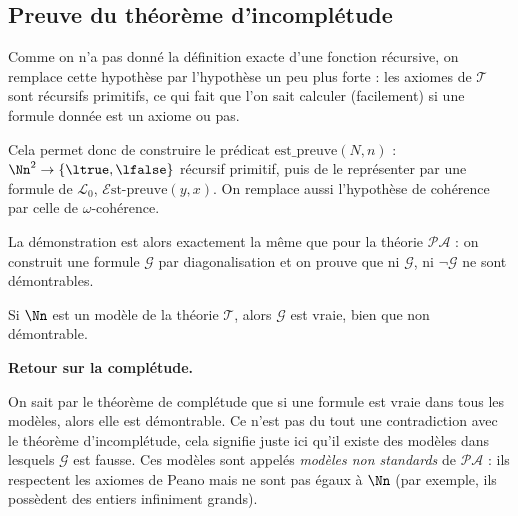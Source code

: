 \documentclass[11pt,class=report,crop=false]{standalone}
\begin{document}
\subsection{Preuve du théorème d'incomplétude}


Comme on n'a pas donné la définition exacte d'une fonction récursive, on remplace cette hypothèse par l'hypothèse un peu plus forte : \og{}les axiomes de $\mathcal{T}$ sont récursifs primitifs\fg{}, ce qui fait que l'on sait calculer (facilement) si une formule donnée est un axiome ou pas.

Cela permet donc de construire le prédicat $\text{est\_preuve}(N, n)$ : $\Nn^2 \to \{\ltrue,\lfalse\}$ récursif primitif, puis de le représenter par une formule de $\mathcal{L}_0$, $\mathcal{E}\text{st-preuve}(y, x)$.
On remplace aussi l'hypothèse de cohérence par celle de $\omega$-cohérence.

La démonstration est alors exactement la même que pour la théorie $\mathcal{PA}$ : on construit une formule $\mathcal{G}$ par diagonalisation et on prouve que ni $\mathcal{G}$, ni $\lnot\mathcal{G}$ ne sont démontrables.

Si $\Nn$ est un modèle de la théorie $\mathcal{T}$, alors $\mathcal{G}$ est vraie, bien que non démontrable.

\bigskip

\textbf{Retour sur la complétude.}

On sait par le théorème de complétude que si une formule est vraie dans tous les modèles, alors elle est démontrable. Ce n'est pas du tout une contradiction avec le théorème d'incomplétude, cela signifie juste ici qu'il existe des modèles dans lesquels $\mathcal{G}$ est fausse. Ces modèles sont appelés \emph{modèles non standards} de $\mathcal{PA}$ : ils respectent les axiomes de Peano mais ne sont pas égaux à $\Nn$ (par exemple, ils possèdent des entiers infiniment grands).




\begin{exercicecours}

\end{exercicecours}

\end{document}
